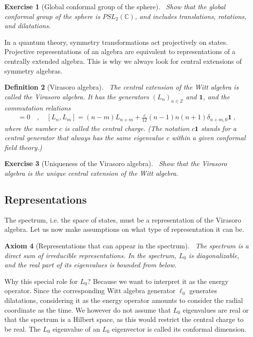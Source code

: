 \documentclass[12pt, a4paper]{article}
\theoremstyle{break}
\newtheorem{exo}{Exercise}[section]
\newtheorem{hyp}[exo]{Axiom}
\newtheorem{defn}[exo]{Definition}
\begin{document}
\begin{exo}[Global conformal group of the sphere]
 ~\label{exo:sphere}
Show that the global conformal group of the sphere is $PSL_2(\mathbb{C})$, and includes translations, rotations, and dilatations. 
\end{exo}

In a quantum theory, symmetry transformations act projectively on states. 
Projective representations of an algebra are equivalent to representations of a centrally extended algebra. 
This is why we always look for central extensions of symmetry algebras.

\begin{defn}[Virasoro algebra]
 ~\label{def:vir}
 The central extension of the Witt algebra is called the Virasoro algebra. It has the generators $(L_n)_{n\in\mathbb{Z}}$ and $\mathbf 1$, and the commutation relations
 \begin{align}
  [\mathbf 1, L_n] = 0 \quad , \quad [L_n,L_m] = (n-m)L_{n+m} +\frac{c}{12}(n-1)n(n+1)\delta_{n+m,0}\mathbf 1 \ ,
  \label{eq:vir}
 \end{align}
 where the number $c$ is called the central charge. (The notation $c\mathbf 1$ stands for a central generator that always has the same eigenvalue $c$ within a given conformal field theory.)
\end{defn}

\begin{exo}[Uniqueness of the Virasoro algebra]
 ~\label{exo:vir}
 Show that the Virasoro algebra is the unique central extension of the Witt algebra.
\end{exo}


\subsection{Representations}

The spectrum, i.e. the space of states, must be a representation of the Virasoro algebra. Let us now make assumptions on what type of representation it can be.

\begin{hyp}[Representations that can appear in the spectrum]
 ~\label{hyp:rep}
 The spectrum is a direct sum of irreducible representations. In the spectrum, $L_0$ is diagonalizable, and the real part of its eigenvalues is bounded from below.
\end{hyp}
Why this special role for $L_0$? Because we want to interpret it as the energy operator. Since the corresponding Witt algebra generator $\ell_0$ generates dilatations, considering it as the energy operator amounts to consider the radial coordinate as the time. We however do not assume that $L_0$ eigenvalues are real or that the spectrum is a Hilbert space, as this would restrict the central charge to be real. The $L_0$ eigenvalue of an $L_0$ eigenvector is called its conformal dimension.
\end{document}

